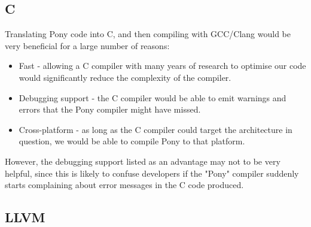 \documentclass[11pt,a4paper]{report}
\begin{document}
\subsection{C}

Translating Pony code into C, and then compiling with GCC/Clang would be very beneficial for a large number of reasons:
\begin{itemize}[noitemsep]
	\item Fast - allowing a C compiler with many years of research to optimise our code would significantly reduce the complexity of the compiler.
	\item Debugging support - the C compiler would be able to emit warnings and errors that the Pony compiler might have missed.
	\item Cross-platform - as long as the C compiler could target the architecture in question, we would be able to compile Pony to that platform.
\end{itemize}

However, the debugging support listed as an advantage may not to be very helpful, since this is likely to confuse developers if the "Pony" compiler suddenly starts complaining about error messages in the C code produced.

\subsection{LLVM}
\end{document}
